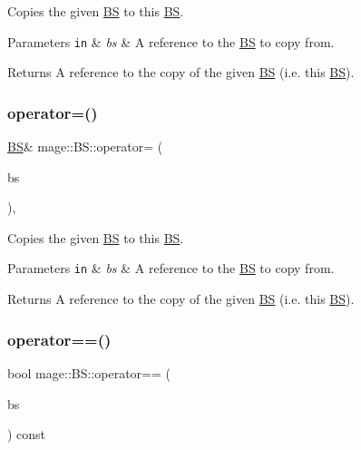 Copies the given \hyperlink{classmage_1_1_b_s}{BS} to this \hyperlink{classmage_1_1_b_s}{BS}.


\begin{DoxyParams}[1]{Parameters}
\mbox{\tt in}  & {\em bs} & A reference to the \hyperlink{classmage_1_1_b_s}{BS} to copy from. \\
\hline
\end{DoxyParams}
\begin{DoxyReturn}{Returns}
A reference to the copy of the given \hyperlink{classmage_1_1_b_s}{BS} (i.\+e. this \hyperlink{classmage_1_1_b_s}{BS}). 
\end{DoxyReturn}
\hypertarget{classmage_1_1_b_s_aec1cd810cb8cd42e3def7a74ba432a7c}{}\label{classmage_1_1_b_s_aec1cd810cb8cd42e3def7a74ba432a7c} 
\subsubsection{\texorpdfstring{operator=()}{operator=()}\hspace{0.1cm}{\footnotesize\ttfamily [2/2]}}
{\footnotesize\ttfamily \hyperlink{classmage_1_1_b_s}{BS}\& mage\+::\+B\+S\+::operator= (\begin{DoxyParamCaption}\item[{\hyperlink{classmage_1_1_b_s}{BS} \&\&}]{bs }\end{DoxyParamCaption})\hspace{0.3cm}{\ttfamily [default]}, {\ttfamily [noexcept]}}

Copies the given \hyperlink{classmage_1_1_b_s}{BS} to this \hyperlink{classmage_1_1_b_s}{BS}.


\begin{DoxyParams}[1]{Parameters}
\mbox{\tt in}  & {\em bs} & A reference to the \hyperlink{classmage_1_1_b_s}{BS} to copy from. \\
\hline
\end{DoxyParams}
\begin{DoxyReturn}{Returns}
A reference to the copy of the given \hyperlink{classmage_1_1_b_s}{BS} (i.\+e. this \hyperlink{classmage_1_1_b_s}{BS}). 
\end{DoxyReturn}
\hypertarget{classmage_1_1_b_s_a5824712c541644eb0b60335957c23463}{}\label{classmage_1_1_b_s_a5824712c541644eb0b60335957c23463} 
\subsubsection{\texorpdfstring{operator==()}{operator==()}}
{\footnotesize\ttfamily bool mage\+::\+B\+S\+::operator== (\begin{DoxyParamCaption}\item[{const \hyperlink{classmage_1_1_b_s}{BS} \&}]{bs }\end{DoxyParamCaption}) const\hspace{0.3cm}{\ttfamily [noexcept]}}


